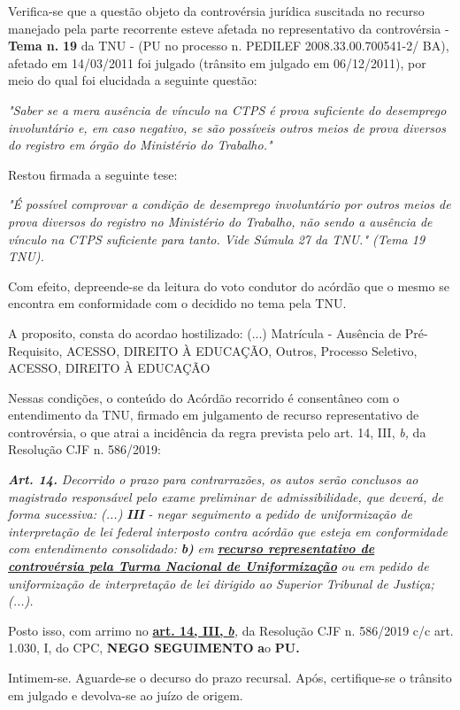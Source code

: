 \documentclass[12pt]{article}
\begin{document}
\justifying
\noindent Verifica-se que a questão objeto da controvérsia jurídica suscitada no recurso manejado pela parte recorrente esteve afetada no representativo da controvérsia - \textbf{Tema n. }\textbf{19} da TNU - (PU no processo n. PEDILEF 2008.33.00.700541-2/ BA),  afetado em 14/03/2011 foi julgado (trânsito em julgado em 06/12/2011), por meio do qual foi elucidada a seguinte questão:

\noindent \textit{"Saber se a mera ausência de vínculo na CTPS é prova suficiente do desemprego involuntário e, em caso negativo, se são possíveis outros meios de prova diversos do registro em órgão do Ministério do Trabalho."}

\noindent Restou firmada a seguinte tese:

\noindent \textit{"É possível comprovar a condição de desemprego involuntário por outros meios de prova diversos do registro no Ministério do Trabalho, não sendo a ausência de vínculo na CTPS suficiente para tanto. Vide Súmula 27 da TNU." (Tema 19 TNU).}

\noindent Com efeito, depreende-se da leitura do voto condutor do acórdão que o mesmo se encontra em conformidade com o decidido no  tema pela TNU.

\noindent A proposito, consta do acordao hostilizado: (...) Matrícula - Ausência de Pré-Requisito, ACESSO, DIREITO À EDUCAÇÃO, Outros, Processo Seletivo, ACESSO, DIREITO À EDUCAÇÃO

\noindent Nessas condições, o conteúdo do Acórdão recorrido é consentâneo com o entendimento da TNU, firmado em julgamento de recurso representativo de controvérsia, o que atrai a incidência da regra prevista pelo art. 14, III, \textit{b,} da Resolução CJF n. 586/2019:

\noindent \textit{\textbf{Art. 14.}}\textit{ Decorrido o prazo para contrarrazões, os autos serão conclusos ao magistrado responsável pelo exame preliminar de admissibilidade, que deverá, de forma sucessiva: (...) }\textit{\textbf{III }}\textit{- negar seguimento a pedido de uniformização de interpretação de lei federal interposto contra acórdão que esteja em conformidade com entendimento consolidado: }\textit{\textbf{b)}}\textit{ em }\uline{\textit{\textbf{recurso representativo de controvérsia pela Turma Nacional de Uniformização}}}\textit{ ou em pedido de uniformização de interpretação de lei dirigido ao Superior Tribunal de Justiça;(...).}

\noindent Posto isso, com arrimo no \uline{\textbf{art. 14, III, }}\uline{\textit{\textbf{b}}}\textit{,} da Resolução CJF n. 586/2019 c/c art. 1.030, I, do CPC, \textbf{NEGO SEGUIMENTO }\textbf{a}o\textbf{ PU}\textbf{.}

\noindent Intimem-se. Aguarde-se o decurso do prazo recursal. Após, certifique-se o trânsito em julgado e devolva-se ao juízo de origem.
\end{document}
